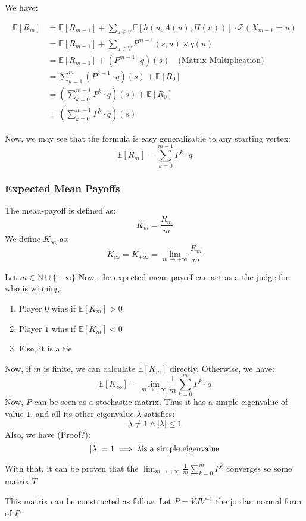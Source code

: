 We have:

\begin{align*}
	\mathbb{E}[R_m]&= \mathbb{E}[R_{m-1}]+\sum_{u\in V}\mathbb{E}[h(u,A(u),\Pi(u))] \cdot \mathcal{P}(X_{m-1}=u) \\
	&=\mathbb{E}[R_{m-1}]+\sum_{u\in V}P^{m-1}(s,u)\times q(u)\\ 
	&=\mathbb{E}[R_{m-1}]+(P^{m-1}\cdot q)(s)\quad \text{(Matrix Multiplication)} \\
	&=\sum_{k=1}^m(P^{k-1}\cdot q)(s)+ \mathbb{E}[R_0]  \\
	&=\left(\sum_{k=0}^{m-1}P^{k}\cdot q\right)(s)+ \mathbb{E}[R_0] \\
	&=\left(\sum_{k=0}^{m-1}P^{k}\cdot q\right)(s)
\end{align*}

Now, we may see that the formula is easy generalisable to any starting vertex:
$$
\mathbb{E}[R_m]=\sum_{k=0}^{m-1}P^{k}\cdot q
$$

\subsubsection{Expected Mean Payoffs}
The mean-payoff is defined as:
$$
K_m=\frac{R_m}{m}
$$
We define $K_\infty$ as:
$$
K_\infty=K_{+\infty}=\lim_{m \rightarrow +\infty} \frac{R_m}{m}
$$

Let $m\in\mathbb{N}\cup\{+\infty\}$
Now, the expected mean-payoff can act as a the judge for who is winning:
\begin{enumerate}
	\item Player $0$ wins if $\mathbb{E}[K_m]>0$
	\item Player $1$ wins if $\mathbb{E}[K_m]<0$
	\item Else, it is a tie
\end{enumerate}


Now, if $m$ is finite, we can calculate $\mathbb{E}[K_m]$ directly.
Otherwise, we have:
$$
\mathbb{E}[K_{\infty}]=\lim_{m\rightarrow +\infty}\frac{1}{m} \sum_{k=0}^m P^k \cdot q
$$
Now, $P$ can be seen as a stochastic matrix.
Thus it has a simple eigenvalue of value $1$, and all its other eigenvalue $\lambda$ satisfies:
$$
\lambda \neq 1 \wedge \lvert\lambda \rvert \le 1
$$
Also, we have (Proof?):
$$
\lvert \lambda \rvert =1\implies \lambda \space\text{is a simple eigenvalue}
$$

With that, it can be proven that the $\lim_{m\rightarrow +\infty}\frac{1}{m} \sum_{k=0}^m P^k$ converges so some matrix $T$

This matrix can be constructed as follow.
Let $P=VJV^{-1}$ the jordan normal form of $P$

